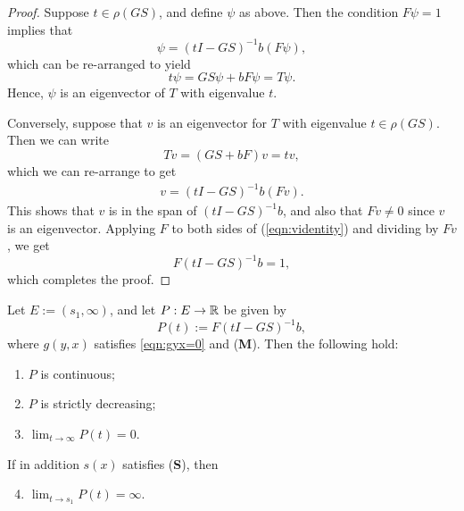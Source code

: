 \begin{proof}
	Suppose $t \in \rho(GS)$, and define $\psi$ as above. Then the condition $F\psi = 1$ implies that
	\[\psi = (t I - GS)^{-1} b (F \psi),\]
	which can be re-arranged to yield
	\[t \psi = GS \psi + bF \psi = T \psi.\]
	Hence, $\psi$ is an eigenvector of $T$ with eigenvalue $t$.
	
	Conversely, suppose that $v$ is an eigenvector for $T$ with eigenvalue $t \in \rho(GS)$. Then we can write
	\[T v = (GS + bF)v = t v,\]
	which we can re-arrange to get
	\begin{align}
		v = (t I - GS)^{-1} b (F v). \label{eqn:videntity}
	\end{align}
	This shows that $v$ is in the span of $(t I - GS)^{-1}b$, and also that $F v \neq 0$ since $v$ is an eigenvector. Applying $F$ to both sides of (\ref{eqn:videntity}) and dividing by $F v$, we get
	\[F(t I - GS)^{-1}b = 1,\]
	which completes the proof.
	
\end{proof}

\begin{lemma} \label{th:Pmufacts}
	Let $E:= (s_1, \infty)$, and let $P:E \to \mathbb{R}$ be given by
	\[P(t):= F(t I-GS)^{-1}b,\]
	where $g(y,x)$ satisfies \eqref{eqn:gyx=0} and (\textbf{M}). Then the following hold:
	\begin{enumerate}
		\item $P$ is continuous; \label{continuous}
		\item $P$ is strictly decreasing; \label{decreasing}
		\item $\lim_{t \to \infty} P(t) = 0$. \label{ptozero}
	\end{enumerate}
	If in addition $s(x)$ satisfies (\textbf{S}), then
	\begin{enumerate}
		\setcounter{enumi}{3}
		\item $\lim_{t \to s_1} P(t) = \infty$. \label{ptoinfty}
	\end{enumerate}
\end{lemma}

